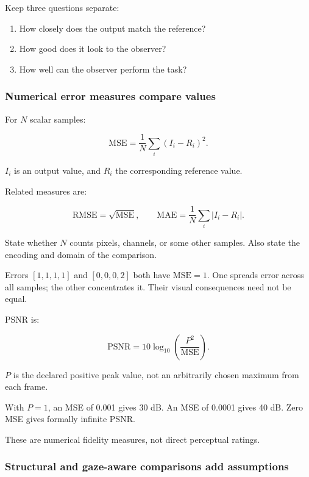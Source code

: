 Keep three questions separate:

\begin{enumerate}
\def\labelenumi{\arabic{enumi}.}
\tightlist
\item
  How closely does the output match the reference?
\item
  How good does it look to the observer?
\item
  How well can the observer perform the task?
\end{enumerate}

\subsubsection{Numerical error measures compare values}\label{04-visual-computing-ii-ch042-numerical-error-measures-compare-values}

\hypertarget{04-visual-computing-ii-ch042-numerical-error-measures-compare-values}{}

For \(N\) scalar samples:

\[
\mathrm{MSE}=\frac1N\sum_i(I_i-R_i)^2.
\]

\(I_i\) is an output value, and \(R_i\) the corresponding reference value.

Related measures are:

\[
\mathrm{RMSE}=\sqrt{\mathrm{MSE}},
\qquad
\mathrm{MAE}=\frac1N\sum_i|I_i-R_i|.
\]

State whether \(N\) counts pixels, channels, or some other samples. Also state the encoding and domain of the comparison.

Errors \([1,1,1,1]\) and \([0,0,0,2]\) both have \(\mathrm{MSE}=1\). One spreads error across all samples; the other concentrates it. Their visual consequences need not be equal.

PSNR is:

\[
\mathrm{PSNR}
=10\log_{10}\left(\frac{P^2}{\mathrm{MSE}}\right).
\]

\(P\) is the declared positive peak value, not an arbitrarily chosen maximum from each frame.

With \(P=1\), an MSE of 0.001 gives 30 dB. An MSE of 0.0001 gives 40 dB. Zero MSE gives formally infinite PSNR.

These are numerical fidelity measures, not direct perceptual ratings.

\subsubsection{Structural and gaze-aware comparisons add assumptions}\label{04-visual-computing-ii-ch042-structural-and-gaze-aware-comparisons-add-assumptions}


